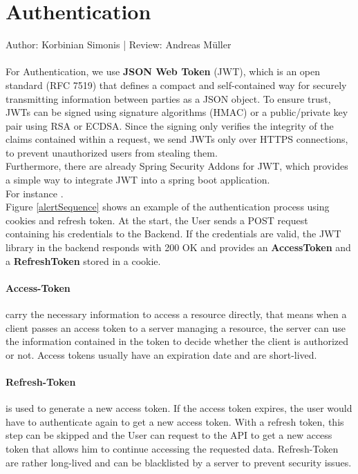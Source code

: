 \documentclass{scrreprt}
\begin{document}
\section{Authentication}
Author: Korbinian Simonis | Review: Andreas M\"uller  \\ \\
For Authentication, we use \textbf{JSON Web Token} (JWT), which is an open standard (RFC 7519) that defines a compact and self-contained way for securely transmitting information between parties as a JSON object. To ensure trust, JWTs can be signed using signature algorithms (HMAC) or a public/private key pair using RSA or ECDSA. Since the signing only verifies the integrity of the claims contained within a request, we send JWTs only over HTTPS connections, to prevent unauthorized users from stealing them. \\
Furthermore, there are already Spring Security Addons for JWT, which provides a simple way to integrate JWT into a spring boot application. \\
For instance .\\
\noindent Figure \ref{alertSequence} shows an example of the authentication process using cookies and refresh token.
At the start, the User sends a POST request containing his credentials to the Backend. If the credentials are valid, the JWT library in the backend responds with 200 OK and provides an \textbf{AccessToken} and a \textbf{RefreshToken} stored in a cookie. 
\paragraph{Access-Token} carry the necessary information to access a resource directly, that means when a client passes an access token to a server managing a resource, the server can use the information contained in the token to decide whether the client is authorized or not. Access tokens usually have an expiration date and are short-lived.
\paragraph{Refresh-Token} is used to generate a new access token. If the access token expires, the user would have to authenticate again to get a new access token. With a refresh token, this step can be skipped and the User can request to the API to get a new access token that allows him to continue accessing the requested data. Refresh-Token are rather long-lived and can be blacklisted by a server to prevent security issues. \\
\end{document}
